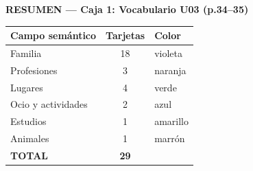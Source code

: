 \documentclass[a4paper,landscape,8pt]{article}
\begin{document}
\vspace{1cm}


\begin{center}
{\large\textbf{RESUMEN — Caja 1: Vocabulario U03 (p.34--35)}}\\[0.4cm]

\begin{tabular}{|l|c|l|}
\hline
\rowcolor{gris}
\textbf{Campo semántico} & \textbf{Tarjetas} & \textbf{Color} \\
\hline
\textcolor{violeta}{Familia} & 18 & violeta \\
\hline
\textcolor{naranja}{Profesiones} & 3 & naranja \\
\hline
\textcolor{verde}{Lugares} & 4 & verde \\
\hline
\textcolor{azulclaro}{Ocio y actividades} & 2 & azul \\
\hline
\textcolor{amarillo}{Estudios} & 1 & amarillo \\
\hline
\textcolor{marron}{Animales} & 1 & marrón \\
\hline
\textbf{TOTAL} & \textbf{29} & \\
\hline
\end{tabular}
\end{center}
\end{document}
